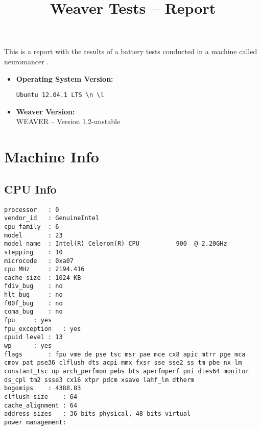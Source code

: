 \documentclass{article}
\title{Weaver Tests -- Report}
\begin{document}
\maketitle
This is a report with the results of a battery
tests conducted in a machine called 
neuromancer
.
\begin{itemize}
\item
\textbf{Operating System Version: }
\begin{verbatim}
Ubuntu 12.04.1 LTS \n \l

\end{verbatim}
\item
\textbf{Weaver Version: }\\
WEAVER -- Version 1.2-unstable
\end{itemize}
\section{Machine Info}
\subsection{CPU Info}
\begin{verbatim}
processor	: 0
vendor_id	: GenuineIntel
cpu family	: 6
model		: 23
model name	: Intel(R) Celeron(R) CPU          900  @ 2.20GHz
stepping	: 10
microcode	: 0xa07
cpu MHz		: 2194.416
cache size	: 1024 KB
fdiv_bug	: no
hlt_bug		: no
f00f_bug	: no
coma_bug	: no
fpu		: yes
fpu_exception	: yes
cpuid level	: 13
wp		: yes
flags		: fpu vme de pse tsc msr pae mce cx8 apic mtrr pge mca cmov pat pse36 clflush dts acpi mmx fxsr sse sse2 ss tm pbe nx lm constant_tsc up arch_perfmon pebs bts aperfmperf pni dtes64 monitor ds_cpl tm2 ssse3 cx16 xtpr pdcm xsave lahf_lm dtherm
bogomips	: 4388.83
clflush size	: 64
cache_alignment	: 64
address sizes	: 36 bits physical, 48 bits virtual
power management:

\end{verbatim}
\end{document}
